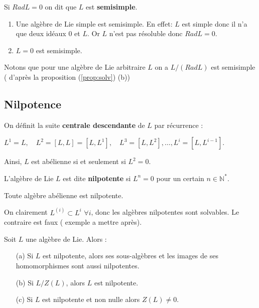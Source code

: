 \documentclass[a4paper,openany,12pt]{report}
\newcommand{\NN}{\mathbb{N}}
\theoremstyle{break}
{\theorembodyfont{\upshape}
\newtheorem*{rmq}{Remarque :}
\newtheorem*{prv}{Preuve :}
\newtheorem*{ex}{Exemples :}
\newtheorem{exe}{Exemple : }
\newtheorem*{nota}{Notation :}}
\begin{document}
\begin{df}
\quad Si $Rad L=0$ on dit que $L$ est \textbf{semisimple}.
\end{df}

\begin{ex}
\begin{enumerate}
\item Une algèbre de Lie simple est semisimple.
En effet: $L$ est simple donc il n'a que deux idéaux ${0}$ et $L$. Or $L$ n'est pas résoluble donc $Rad L= {0}$.
\item $L=0$ est semisimple.
\end{enumerate}
\end{ex}

Notons que pour une algèbre de Lie arbitraire $L$ on a $L/(Rad L)$ est semisimple ( d'après la proposition (\ref{prop:solv}) (b))

\subsection{Nilpotence}

On définit la suite \textbf{centrale descendante} de $L$ par récurrence :
\begin{center}
$L^{1}=L, \quad L^{2}=[L, L]=\left[L, L^{1}\right], \quad L^{3}=\left[L, L^{2}\right], \ldots, L^{i}=\left[L, L^{i-1}\right]$.
\end{center}
Ainsi, $L$ est abélienne si et seulement si $L^{2}=0$.

\begin{df}
L'algèbre de Lie $L$ est dite \textbf{nilpotente} si $L^{n}=0$ pour un certain $n \in \NN^{*}$.
\end{df}

\begin{ex}
Toute algèbre abélienne est nilpotente.

On clairement $L^{(i)}\subset L^{i}$ $\forall i$, donc les algèbres nilpotentes sont solvables.
Le contraire est faux ( exemple a mettre après).
\end{ex}

\begin{prop}\label{prop:nilp}
\quad Soit $L$ une algèbre de Lie. Alors :
\begin{itemize}
\item[(a)] Si $L$ est nilpotente, alors ses sous-algèbres et les images de ses homomorphismes sont aussi nilpotentes.

\item[(b)]  Si $L/Z(L)$, alors $L$ est nilpotente.

\item[(c)] Si $L$ est nilpotente et non nulle alors $Z(L) \ne 0$.
\end{itemize}
\end{prop}
\end{document}
